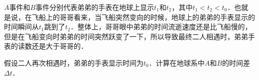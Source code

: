 $A$事件和$B$事件分别代表弟弟的手表在地球上显示$t_1$和$t_2$，其中$t_1<t_2<t_0$．也就是说，在飞船上的哥哥看来，当飞船突然变向的时候，地球上的弟弟的手表显示的时间瞬间从$t_1$跳到了$t_2$．整体上，哥哥眼中弟弟的时间流逝速度还是比飞船慢的，但是在飞船变向时弟弟的时间突然跃变了一下，所以导致最终二人相遇时，弟弟手表的读数还是大于哥哥的．

\begin{exercise}{}\label{Twins_exe1}
假设二人再次相遇时，弟弟的手表显示时间为$t_0$．计算在地球系中$A$和$B$的时间差$\Delta t$．
\end{exercise}









